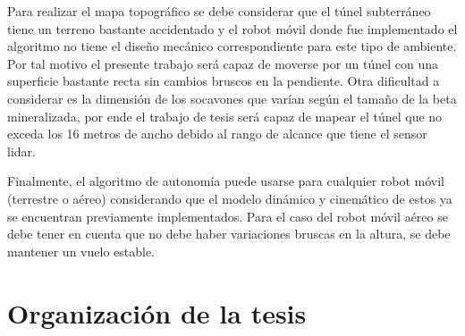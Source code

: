 Para realizar el mapa topogr\'afico se debe considerar que el t\'unel subterr\'aneo 
tiene un terreno bastante accidentado y el robot m\'ovil donde fue implementado el 
algoritmo no tiene el diseño mec\'anico correspondiente para este tipo de ambiente. Por 
tal motivo el presente trabajo ser\'a capaz de moverse por un t\'unel con una superficie 
bastante recta sin cambios bruscos en la pendiente. Otra dificultad a considerar es la 
dimensi\'on de los socavones que var\'ian seg\'un el tama\~no de la beta mineralizada, por 
ende el trabajo de tesis ser\'a capaz de mapear el t\'unel que no exceda los 16 metros de 
ancho debido al rango de alcance que tiene el sensor lidar. 

Finalmente, el algoritmo de autonom\'ia puede usarse para cualquier robot m\'ovil (terrestre 
o a\'ereo) considerando que el modelo din\'amico y cinem\'atico de estos ya se encuentran 
previamente implementados. Para el caso del robot m\'ovil a\'ereo se debe tener en cuenta 
que no debe haber variaciones bruscas en la altura, se debe mantener un vuelo estable.

\section{Organizaci\'on de la tesis}



